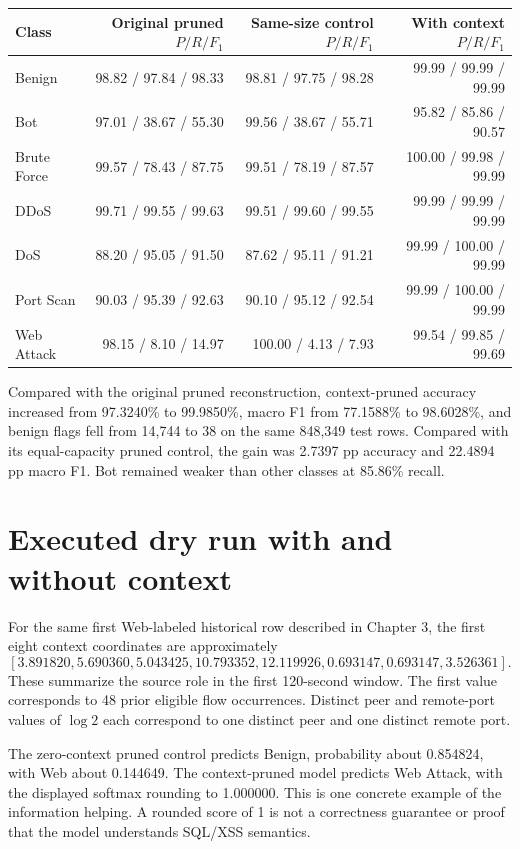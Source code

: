 \documentclass[11pt,a4paper,oneside]{report}
\begin{document}
{\small
\begin{longtable}{@{}lrrr@{}}
\toprule
Class & Original pruned $P/R/F_1$ & Same-size control $P/R/F_1$ & With context $P/R/F_1$\\\midrule\endhead
Benign & 98.82 / 97.84 / 98.33 & 98.81 / 97.75 / 98.28 & 99.99 / 99.99 / 99.99\\
Bot & 97.01 / 38.67 / 55.30 & 99.56 / 38.67 / 55.71 & 95.82 / 85.86 / 90.57\\
Brute Force & 99.57 / 78.43 / 87.75 & 99.51 / 78.19 / 87.57 & 100.00 / 99.98 / 99.99\\
DDoS & 99.71 / 99.55 / 99.63 & 99.51 / 99.60 / 99.55 & 99.99 / 99.99 / 99.99\\
DoS & 88.20 / 95.05 / 91.50 & 87.62 / 95.11 / 91.21 & 99.99 / 100.00 / 99.99\\
Port Scan & 90.03 / 95.39 / 92.63 & 90.10 / 95.12 / 92.54 & 99.99 / 100.00 / 99.99\\
Web Attack & 98.15 / 8.10 / 14.97 & 100.00 / 4.13 / 7.93 & 99.54 / 99.85 / 99.69\\
\bottomrule\end{longtable}
}

Compared with the original pruned reconstruction, context-pruned accuracy increased from 97.3240\% to 99.9850\%, macro F1 from 77.1588\% to 98.6028\%, and benign flags fell from 14,744 to 38 on the same 848,349 test rows. Compared with its equal-capacity pruned control, the gain was 2.7397 pp accuracy and 22.4894 pp macro F1. Bot remained weaker than other classes at 85.86\% recall.

\section{Executed dry run with and without context}
For the same first Web-labeled historical row described in Chapter 3, the first eight context coordinates are approximately
\[[3.891820,5.690360,5.043425,10.793352,12.119926,0.693147,0.693147,3.526361].\]
These summarize the source role in the first 120-second window. The first value corresponds to 48 prior eligible flow occurrences. Distinct peer and remote-port values of $\log 2$ each correspond to one distinct peer and one distinct remote port.

The zero-context pruned control predicts Benign, probability about 0.854824, with Web about 0.144649. The context-pruned model predicts Web Attack, with the displayed softmax rounding to 1.000000. This is one concrete example of the information helping. A rounded score of 1 is not a correctness guarantee or proof that the model understands SQL/XSS semantics.
\end{document}
